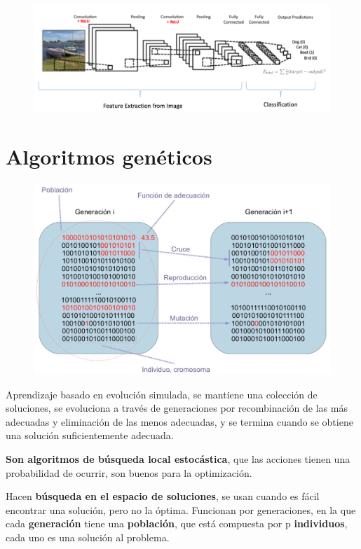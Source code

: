 \documentclass[12pt, twoside, openright]{report} %
\begin{document}
\begin{figure}[H]
	{\includegraphics[scale=.3]{image-20210312111406573.png}}
\end{figure}

\section{Algoritmos genéticos}
\begin{figure}[H]
	{\includegraphics[scale=.4]{2021-03-19 11_26_59-otras-tecnicas.pdf - Foxit Reader.png}}
\end{figure}
Aprendizaje basado en evolución simulada, se mantiene una colección de soluciones, se evoluciona a través de generaciones por recombinación de las más adecuadas y eliminación de las menos adecuadas, y se termina cuando se obtiene una solución suficientemente adecuada.

\textbf{Son algoritmos de búsqueda local estocástica}, que las acciones tienen una probabilidad de ocurrir, son buenos para la optimización.

Hacen \textbf{búsqueda en el espacio de soluciones}, se usan cuando es fácil encontrar una solución, pero no la óptima. Funcionan por generaciones, en la que cada \textbf{generación} tiene una \textbf{población}, que está compuesta por p \textbf{individuos}, cada uno es una solución al problema.
\end{document}
